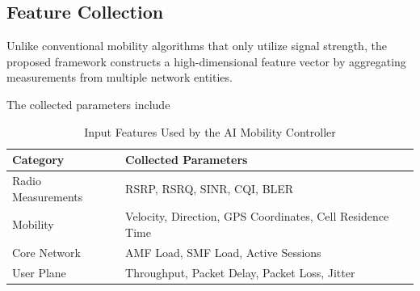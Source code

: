 \documentclass[12pt,a4paper]{article}\usepackage[a4paper,margin=1in]{geometry}\usepackage{graphicx}\usepackage{longtable}\usepackage{booktabs}\usepackage{hyperref}\usepackage{enumitem}\usepackage{amsmath}\usepackage{tikz}\usepackage{pgfgantt}\usepackage{setspace}\setstretch{1.15}\usetikzlibrary{positioning,arrows.meta,shapes.geometric}
\begin{document}
	
	\subsection{Feature Collection}
	
	Unlike conventional mobility algorithms that only utilize signal strength, the proposed framework constructs a high-dimensional feature vector by aggregating measurements from multiple network entities.
	
	The collected parameters include
	
	\begin{table}[h]
		
		\centering
		
		\caption{Input Features Used by the AI Mobility Controller}
		
		\label{tab:features}
		
		\begin{tabular}{p{4cm}p{9cm}}
			
			\toprule
			
			\textbf{Category}
			
			&
			
			\textbf{Collected Parameters}
			
			\\
			
			\midrule
			
			Radio Measurements
			
			&
			
			RSRP, RSRQ, SINR, CQI, BLER
			
			\\
			
			Mobility
			
			&
			
			Velocity, Direction, GPS Coordinates, Cell Residence Time
			
			\\
			
			Core Network
			
			&
			
			AMF Load, SMF Load, Active Sessions
			
			\\
			
			User Plane
			
			&
			
			Throughput, Packet Delay, Packet Loss, Jitter
			
			\\
			

\end{tabular}
\end{table}
\end{document}
